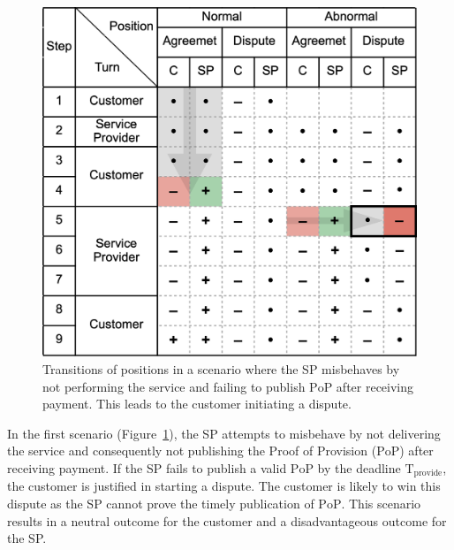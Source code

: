 \documentclass[pdftex,twocolumn,epjc3]{svjour3}
\begin{document}
\begin{figure}[h!]
\includegraphics[width=\linewidth]{misbehaviour.png}
\centering
\caption{Transitions of positions in a scenario where the SP misbehaves by not performing the service and failing to publish $\mathrm{PoP}$ after receiving payment. This leads to the customer initiating a dispute.}
\label{fig:misbehaviour}
\end{figure}

In the first scenario (Figure~\ref{fig:misbehaviour}), the SP attempts to misbehave by not delivering the service and consequently not publishing the Proof of Provision ($\mathrm{PoP}$) after receiving payment. If the SP fails to publish a valid $\mathrm{PoP}$ by the deadline $\mathrm{T}_\mathrm{provide}$, the customer is justified in starting a dispute. The customer is likely to win this dispute as the SP cannot prove the timely publication of $\mathrm{PoP}$. This scenario results in a neutral outcome for the customer and a disadvantageous outcome for the SP.
\end{document}
